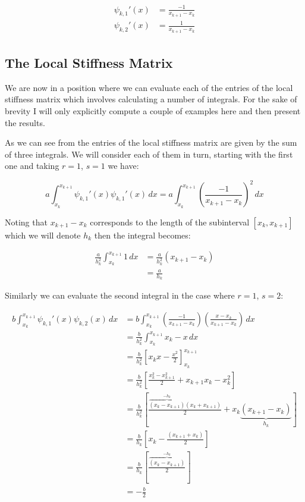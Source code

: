 \begin{align}
  \begin{split}
    \psi_{k,1}'(x) &= \frac{-1}{x_{k+1} - x_{k}} \\
    \psi_{k,2}'(x) &= \frac{1}{x_{k+1} - x_{k}}
  \end{split}
\end{align}

\subsection{The Local Stiffness Matrix}\label{sec:oned-deterministic-local-stiffness}

We are now in a position where we can evaluate each of the entries of the local
stiffness matrix which involves calculating a number of integrals. For
the sake of brevity I will only explicitly compute a couple of examples here
and then present the results.

As we can see from  the entries of
the local stiffness matrix are given by the sum of three integrals. We will
consider each of them in turn, starting with the first one and taking $r = 1$,
$s = 1$ we have:

\begin{equation*}
       a\int_{x_k}^{x_{k+1}}\psi_{k,1}'(x)\psi_{k,1}'(x)\, dx =
         a\int_{x_k}^{x_{k+1}}\left(\frac{-1}{x_{k+1} - x_k}\right)^2\, dx
\end{equation*}

Noting that $x_{k+1} - x_k$ corresponds to the length of the subinterval
$[x_k, x_{k+1}]$ which we will denote $h_k$ then the integral becomes:

\begin{align*}
    \frac{a}{h_k^2}\int_{x_k}^{x_{k+1}}1\, dx &= \frac{a}{h_k^2}(x_{k+1} - x_k) \\
          &= \frac{a}{h_k}
\end{align*}

Similarly we can evaluate the second integral in the case where $r=1$, $s=2$:

\begin{align*}
    b\int_{x_k}^{x_{k+1}}\psi_{k,1}'(x)\psi_{k,2}(x)\, dx
      &=  b\int_{x_k}^{x_{k+1}}\left(\frac{-1}{x_{k+1} - x_k}\right)
                               \left(\frac{x - x_k}{x_{k+1} - x_k}\right)\, dx \\
      &= \frac{b}{h_k^2}\int_{x_k}^{x_{k+1}}x_k - x\, dx \\
      &= \frac{b}{h_k^2}\left[x_kx - \frac{x^2}{2}\right]_{x_k}^{x_{k+1}} \\
      &= \frac{b}{h_k^2}\left[ \frac{x_k^2 - x_{k+1}^2}{2} + x_{k+1}x_k - x_k^2 \right] \\
      &= \frac{b}{h_k^2}\left[ \frac{\overbrace{(x_k - x_{k+1})}^{-h_k}(x_k + x_{k+1})}{2}
              + x_k\underbrace{(x_{k+1} - x_k)}_{h_k}\right] \\
      &= \frac{b}{h_k}\left[ x_k - \frac{(x_{k+1} + x_k)}{2} \right] \\
      &= \frac{b}{h_k}\left[\frac{\overbrace{(x_k - x_{k+1})}^{-h_k}}{2}\right] \\
      &= -\frac{b}{2}
\end{align*}

